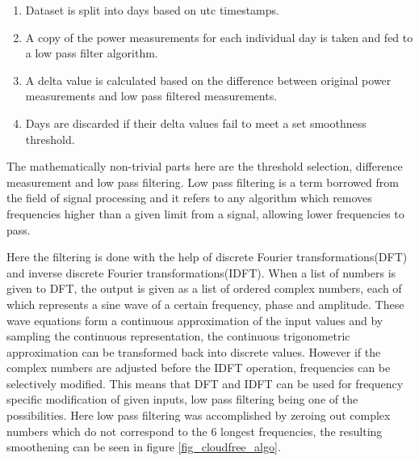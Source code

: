 





\begin{enumerate}
  \item Dataset is split into days based on utc timestamps.
  
  \item A copy of the power measurements for each individual day is taken and fed to a low pass filter algorithm.
  
  
  \item A delta value is calculated based on the difference between original power measurements and low pass filtered measurements.

  
  \item Days are discarded if their delta values fail to meet a set smoothness threshold. 

  
  
\end{enumerate}



\noindent The mathematically non-trivial parts here are the threshold selection, difference measurement and low pass filtering. Low pass filtering is a term borrowed from the field of signal processing and it refers to any algorithm which removes frequencies higher than a given limit from a signal, allowing lower frequencies to pass. 



Here the filtering is done with the help of discrete Fourier transformations(DFT) and inverse discrete Fourier transformations(IDFT). When a list of numbers is given to DFT, the output is given as a list of ordered complex numbers, each of which represents a sine wave of a certain frequency, phase and amplitude. These wave equations form a continuous approximation of the input values and by sampling the continuous representation, the continuous trigonometric approximation can be transformed back into discrete values. However if the complex numbers are adjusted before the IDFT operation, frequencies can be selectively modified. This means that DFT and IDFT can be used for frequency specific modification of given inputs, low pass filtering being one of the possibilities. Here low pass filtering was accomplished by zeroing out complex numbers which do not correspond to the 6 longest frequencies, the resulting smoothening can be seen in figure \ref{fig_cloudfree_algo}.



